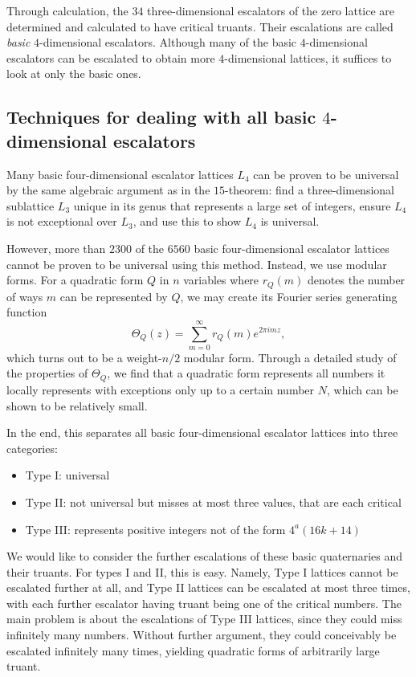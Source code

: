 \documentclass{article}
\begin{document}
Through calculation, the $34$ three-dimensional escalators of the zero lattice are determined and calculated to have critical truants.
Their escalations are called \emph{basic} $4$-dimensional escalators. Although many of the basic $4$-dimensional escalators can be escalated to obtain more $4$-dimensional lattices, it suffices to look at only the basic ones.

\subsection{Techniques for dealing with all basic $4$-dimensional escalators}
Many basic four-dimensional escalator lattices $L_4$ can be proven to be universal by the same algebraic argument as in the $15$-theorem:
find a three-dimensional sublattice $L_3$ unique in its genus that represents a large set of integers, ensure $L_4$ is not exceptional over $L_3$, and use this to show $L_4$ is universal.

However, more than $2300$ of the $6560$ basic four-dimensional escalator lattices cannot be proven to be universal using this method.
Instead, we use modular forms. For a quadratic form $Q$ in $n$ variables where $r_Q(m)$ denotes the number of ways $m$ can be represented by $Q$, we may create its Fourier series generating function
\[\Theta_Q(z) = \sum_{m = 0}^{\infty} r_Q(m) e^{2\pi i m z},\]
which turns out to be a weight-$n/2$ modular form. Through a detailed study of the properties of $\Theta_Q$, we find that a quadratic form represents all numbers it locally represents with exceptions only up to a certain number $N$, which can be shown to be relatively small.

In the end, this separates all basic four-dimensional escalator lattices into three categories:
\begin{itemize}
    \item Type I: universal
    \item Type II: not universal but misses at most three values, that are each critical
    \item Type III: represents positive integers not of the form $4^a(16k+14)$
\end{itemize}
We would like to consider the further escalations of these basic quaternaries and their truants.
For types I and II, this is easy.
Namely, Type I lattices cannot be escalated further at all, and Type II lattices can be escalated at most three times, with each further escalator having truant being one of the critical numbers.
The main problem is about the escalations of Type III lattices, since they could miss infinitely many numbers. Without further argument, they could conceivably be escalated infinitely many times, yielding quadratic forms of arbitrarily large truant.
\end{document}
